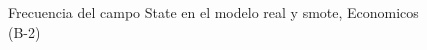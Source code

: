 \begin{figure}[H]
    \centering
    
    \caption{Frecuencia del campo State en el modelo real y smote, Economicos (B-2)}
    \label{frecuency-State-smote-enc}
\end{figure}